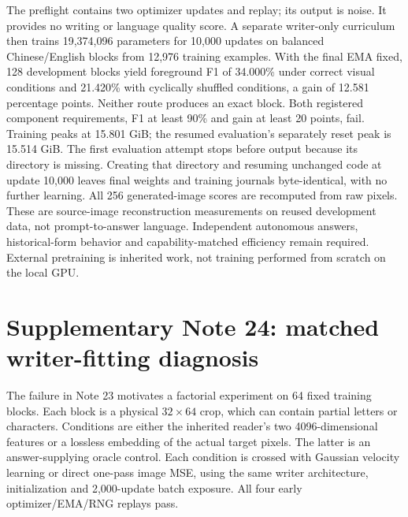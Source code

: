 \documentclass[10pt,a4paper]{article}
\providecommand{\DIFadd}[1]{{\protect\color{blue} \sf #1}} %
\providecommand{\DIFaddbegin}{} %
\begin{document}
The preflight contains two optimizer updates and replay; its output is noise.
It provides no writing or language quality score. A separate writer-only
curriculum then trains 19,374,096 parameters for 10,000 updates on balanced
Chinese/English blocks from 12,976 training examples. With the final EMA fixed,
128 development blocks yield foreground F1 of 34.000\% under correct visual
conditions and 21.420\% with cyclically shuffled conditions, a gain of 12.581
percentage points. Neither route produces an exact block. Both registered
component requirements, F1 at least 90\% and gain at least 20 points, fail.
Training peaks at 15.801 GiB; the resumed evaluation's separately reset peak
is 15.514 GiB. The first evaluation attempt stops before output because its
directory is missing. Creating that directory and resuming unchanged code at
update 10,000 leaves final weights and training journals byte-identical, with
no further learning. All 256 generated-image scores are recomputed from raw
pixels. These are source-image reconstruction measurements on reused
development data, not prompt-to-answer language. Independent autonomous
answers, historical-form behavior and capability-matched efficiency remain
required. External pretraining is inherited work, not training performed
from scratch on the local GPU.


\DIFaddbegin \section*{\DIFadd{Supplementary Note 24: matched writer-fitting diagnosis}}
\DIFadd{The failure in Note 23 motivates a factorial experiment on 64 fixed training
blocks. Each block is a physical $32\times64$ crop, which can contain partial
letters or characters. Conditions are either the inherited reader's two
4096-dimensional features or a lossless embedding of the actual target
pixels. The latter is an answer-supplying oracle control. Each condition is
crossed with Gaussian velocity learning or direct one-pass image MSE, using
the same writer architecture, initialization and 2,000-update batch exposure.
All four early optimizer/EMA/RNG replays pass.
}
\end{document}
